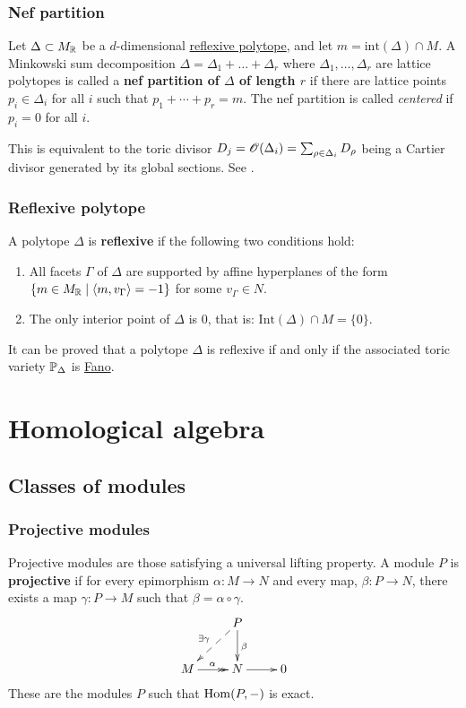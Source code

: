 \documentclass[11pt, english]{article}
\begin{document}
\subsubsection{Nef partition}
\label{nefpartition}
Let $\Delta \subset M_{\mathbb{R}}$ be a $d$-dimensional \hyperref[reflexivepolytope]{reflexive polytope}, and let $m=\mathrm{int}(\Delta) \cap M$. A Minkowski sum decomposition $\Delta=\Delta_1+\dotsc +\Delta_r$ where $\Delta_1,\ldots,\Delta_r$ are lattice polytopes is called a \textbf{nef partition of $\Delta$ of length $r$} if there are lattice points $p_i \in \Delta_i$ for all $i$ such that $p_1+\cdots+p_r = m$. The nef partition is called \emph{centered} if $p_i=0$  for all $i$. 

This is equivalent to the toric divisor $D_j=\operatorname{\mathscr{O}}(\Delta_i)=\sum_{\rho \in \Delta_i} D_\rho$ being a Cartier divisor generated by its global sections. See \cite[Chapter 4.3]{mirrorsymalggeo}.  

\subsubsection{Reflexive polytope}
\label{reflexivepolytope}

A polytope $\Delta$ is \textbf{reflexive} if the following two conditions hold:
\begin{enumerate}
\item All facets $\Gamma$ of $\Delta$ are supported by affine hyperplanes of the form $\{ m \in M_{\mathbb{R}} \mid \langle m,v_\Gamma \rangle = -1 \}$ for some $v_\Gamma \in N$.
\item The only interior point of $\Delta$ is $0$, that is: $\mathrm{Int}(\Delta) \cap M = \{0\}$.
\end{enumerate}

It can be proved that a polytope $\Delta$ is reflexive if and only if the associated toric variety $\mathbb{P}_\Delta$ is \hyperref[fano]{Fano}.

\section{Homological algebra}
\subsection{Classes of modules}
\subsubsection{Projective modules}
\label{projectivemodules}
Projective modules are those satisfying a universal lifting property. A module $P$ is \textbf{projective} if for every epimorphism $\alpha:M \to N$ and every map, $\beta:P \to N$, there exists a map $\gamma:P \to M$ such that $\beta = \alpha \circ \gamma$.
\[
\xymatrix{
 & P \ar@{-->}[dl]_{\exists\gamma} \ar[d]^\beta \\
M \ar@{->>}[r]^\alpha & N \ar[r] & 0
}
\]
These are the modules $P$ such that $\operatorname{Hom}(P,-)$ is exact.
\end{document}
